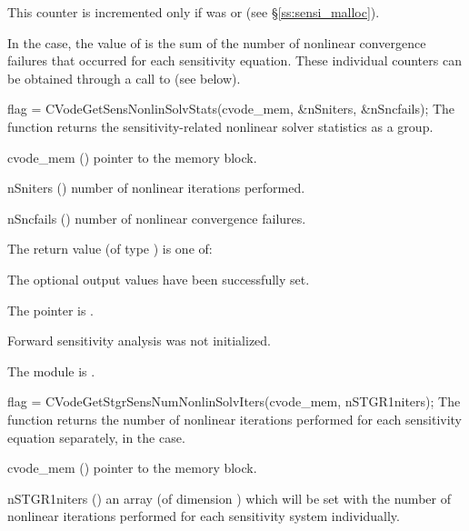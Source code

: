 {
  This counter is incremented only if  was  or 
   (see \S\ref{ss:sensi_malloc}).
  
  In the  case, the value of  is the sum of 
  the number of nonlinear convergence failures that occurred for each sensitivity equation.
  These individual counters can be obtained through a call to
   (see below).
}
{
  flag = CVodeGetSensNonlinSolvStats(cvode\_mem, \&nSniters, \&nSncfails);
}
{
  The function  returns the sensitivity-related
  nonlinear solver statistics as a group.
}
{
  \begin{args}
  \item[cvode\_mem] ()
    pointer to the {\cvodes} memory block.
  \item[nSniters] ()
    number of nonlinear iterations performed.
  \item[nSncfails] ()
    number of nonlinear convergence failures.
  \end{args}
}
{
  The return value  (of type ) is one of:
  \begin{args}
  \item[\Id{CV\_SUCCESS}] 
    The optional output values have been successfully set.
  \item[\Id{CV\_MEM\_NULL}]
    The  pointer is .
  \item[\Id{CV\_NO\_SENS}]
    Forward sensitivity analysis was not initialized.
  \item[\Id{CV\_MEM\_FAIL}]
    The {\sunnonlinsol} module is .
  \end{args}
}
{}
{
  flag = CVodeGetStgrSensNumNonlinSolvIters(cvode\_mem, nSTGR1niters);
}
{
  The function  returns the
  number of nonlinear iterations performed for 
  each sensitivity equation separately, in the  case.
}
{
  \begin{args}
  \item[cvode\_mem] ()
    pointer to the {\cvodes} memory block.
  \item[nSTGR1niters] ()
    an array (of dimension ) which will be set with the number of 
    nonlinear iterations performed for each sensitivity system individually.
  \end{args}
}
